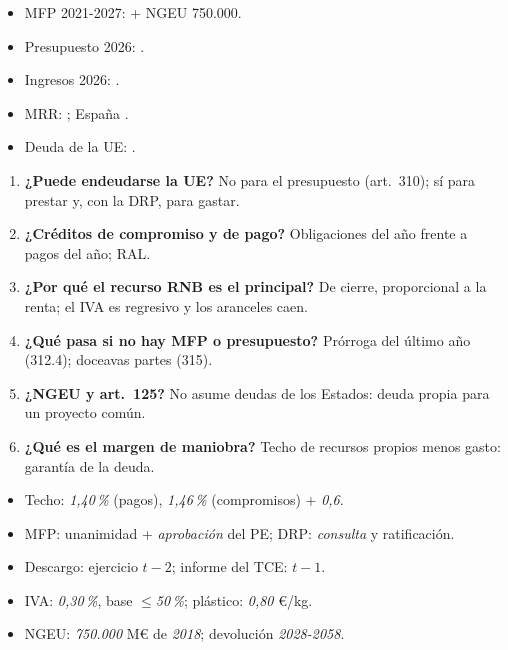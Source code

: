 \documentclass{article}
\begin{document}
\begin{columnas}
\anexorepaso
{}
\begin{itemize}
\item MFP 2021-2027:  + NGEU 750.000.
\item Presupuesto 2026: .
\item Ingresos 2026: .
\item MRR: ; España .
\item Deuda de la UE: .
\end{itemize}
\begin{enumerate}
\item \textbf{¿Puede endeudarse la UE?} No para el presupuesto (art.~310); sí para prestar y, con la DRP, para gastar.
\item \textbf{¿Créditos de compromiso y de pago?} Obligaciones del año frente a pagos del año; RAL.
\item \textbf{¿Por qué el recurso RNB es el principal?} De cierre, proporcional a la renta; el IVA es regresivo y los aranceles caen.
\item \textbf{¿Qué pasa si no hay MFP o presupuesto?} Prórroga del último año (312.4); doceavas partes (315).
\item \textbf{¿NGEU y art.~125?} No asume deudas de los Estados: deuda propia para un proyecto común.
\item \textbf{¿Qué es el margen de maniobra?} Techo de recursos propios menos gasto: garantía de la deuda.
\end{enumerate}
\begin{trampa}
\begin{itemize}
\item Techo: \emph{1,40\,\%} (pagos), \emph{1,46\,\%} (compromisos) + \emph{0,6}.
\item MFP: unanimidad + \emph{aprobación} del PE; DRP: \emph{consulta} y ratificación.
\item Descargo: ejercicio \emph{$t-2$}; informe del TCE: \emph{$t-1$}.
\item IVA: \emph{0,30\,\%}, base $\leq$\emph{50\,\%}; plástico: \emph{0,80} €/kg.
\item NGEU: \emph{750.000} M€ de \emph{2018}; devolución \emph{2028-2058}.
\end{itemize}
\end{trampa}

\end{columnas}
\end{document}

